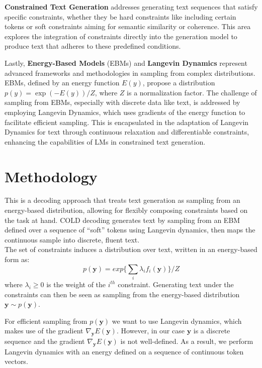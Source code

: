 \documentclass{article}
\begin{document}
\textbf{Constrained Text Generation} addresses generating text sequences that satisfy specific constraints, whether they be hard constraints like including certain tokens or soft constraints aiming for semantic similarity or coherence. This area explores the integration of constraints directly into the generation model to produce text that adheres to these predefined conditions.

Lastly, \textbf{Energy-Based Models} (EBMs) and \textbf{Langevin Dynamics} represent advanced frameworks and methodologies in sampling from complex distributions. EBMs, defined by an energy function \(E(y)\), propose a distribution \(p(y) = \exp{(-E(y))}/Z\), where \(Z\) is a normalization factor. The challenge of sampling from EBMs, especially with discrete data like text, is addressed by employing Langevin Dynamics, which uses gradients of the energy function to facilitate efficient sampling. This is encapsulated in the adaptation of Langevin Dynamics for text through continuous relaxation and differentiable constraints, enhancing the capabilities of LMs in constrained text generation.



\section{Methodology}

This is a decoding approach that treats text generation as sampling from an energy-based distribution, allowing for flexibly composing constraints
based on the task at hand. COLD decoding generates text by sampling from an EBM defined over a
sequence of “soft” tokens using Langevin dynamics, then maps the continuous sample into discrete,
fluent text. \\
The set of constraints induces a distribution over text, written in an energy-based form as:
$$p(\boldsymbol{y}) = exp\{\sum_i \lambda_i f_i(\boldsymbol{y})\}/Z$$
where $\lambda_i \geq 0$ is the weight of the $i^{th}$ constraint. Generating text under the constraints can then be
seen as sampling from the energy-based distribution $\boldsymbol{y} \sim p(\boldsymbol{y})$.

For efficient sampling from $p(\boldsymbol{y})$ we want to use Langevin dynamics, which
makes use of the gradient $\nabla_{\boldsymbol{y}} E(\boldsymbol{y})$. However, in our case $\boldsymbol{y}$ is a discrete sequence and the gradient
$\nabla_{\boldsymbol{y}} E(\boldsymbol{y})$ is not well-defined. As a result, we perform Langevin dynamics with an energy defined on
a sequence of continuous token vectors.
\end{document}
